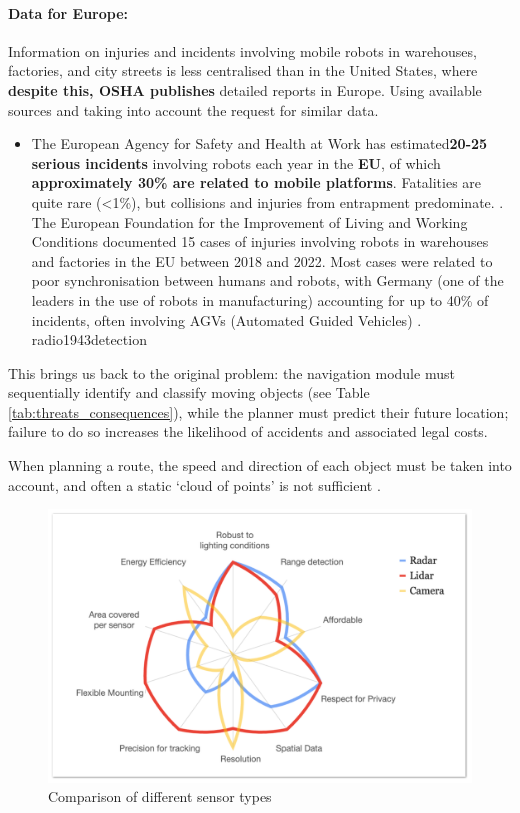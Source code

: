 \paragraph{Data for Europe:} Information on injuries and incidents involving mobile robots in warehouses, factories, and city streets is less centralised than in the United States, where\textbf{ despite this, OSHA publishes} detailed reports in Europe. Using available sources and taking into account the request for similar data.
\begin{itemize}
\item The European Agency for Safety and Health at Work has estimated\textbf{20-25 serious incidents} involving robots each year in the \textbf{EU}, of which \textbf{approximately 30\% are related to mobile platforms}. Fatalities are quite rare (<1\%), but collisions and injuries from entrapment predominate. \citep{oshaeu_robotics2023}.
The European Foundation for the Improvement of Living and Working Conditions documented 15 cases of injuries involving robots in warehouses and factories in the EU between 2018 and 2022. Most cases were related to poor synchronisation between humans and robots, with Germany (one of the leaders in the use of robots in manufacturing) accounting for up to 40\% of incidents, often involving AGVs (Automated Guided Vehicles)
.
radio1943detection\end{itemize}

\noindent

\noindent
This brings us back to the original problem: the navigation module must sequentially identify and classify moving objects (see Table \ref{tab:threats_consequences}), while the planner must predict their future location; failure to do so increases the likelihood of accidents and associated legal costs.

When planning a route, the speed and direction of each object must be taken into account, and often a static ‘cloud of points’ is not sufficient \citep{s24113573}.


\begin{figure}[H]
    \centering
    \includegraphics[width=0.6\linewidth]{Src//images/Sensors-comparison.png}
    \caption{Comparison of different sensor types}
    \label{fig:sensor_comp}
\end{figure}


